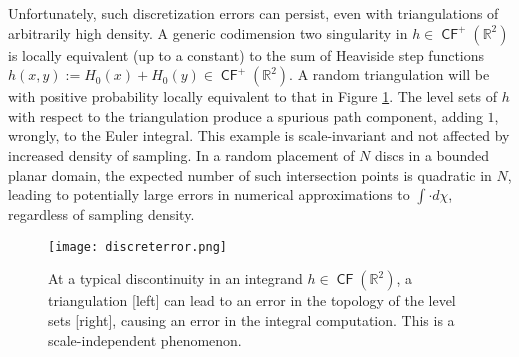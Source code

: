 \documentclass{psapm-l}
\theoremstyle{definition}
\theoremstyle{remark}
\numberwithin{equation}{section}
\begin{document}
Unfortunately, such discretization errors can persist, even with triangulations of arbitrarily high density. A generic codimension two singularity in $h\in {{{\operatorname{\mathsf{{CF}}}}}}^+({{\mathbb R}}^2)$ is locally equivalent (up to a constant) to the sum of Heaviside step functions $h(x,y):=H_0(x)+H_0(y)\in{{{\operatorname{\mathsf{{CF}}}}}}^+({{\mathbb R}}^2)$. A random triangulation will be with positive probability locally equivalent to that in Figure \ref{fig:discreterror}. The level sets of $h$ with respect to the triangulation produce a spurious path component, adding $1$, wrongly, to the Euler integral. This example is scale-invariant and not affected by increased density of sampling. In a random placement of $N$ discs in a bounded planar domain, the expected number of such intersection points is quadratic in $N$, leading to potentially large errors in numerical approximations to $\int\cdot d\chi$, regardless of sampling density.

\begin{figure}[hbt]
\begin{center}
\texttt{[image: discreterror.png]}
\caption{At a typical discontinuity in an integrand $h\in{{{\operatorname{\mathsf{{CF}}}}}}({{\mathbb R}}^2)$, a triangulation [left] can lead to an error in the topology of the level sets [right], causing an error in the integral computation. This is a scale-independent phenomenon.}
\label{fig:discreterror}
\end{center}
\end{figure}
\end{document}
